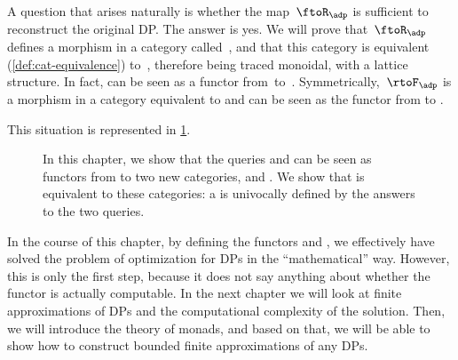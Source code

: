 A question that arises naturally is whether the map~$\ftoR_\adp$ is sufficient to reconstruct the original DP.
The answer is yes.
We will prove that~$\ftoR_\adp$ defines a morphism in a category called~\UPos, and that this category is equivalent (\cref{def:cat-equivalence}) to~\DP, therefore being traced monoidal, with a lattice structure.
In fact, \FixFunMinRes can be seen as a functor from~\DP to~\UPos.
Symmetrically,~$\rtoF_\adp$ is a morphism in a category \LPos equivalent to \DP and \FixResMaxFun can be seen as the functor from \DP to \LPos.

This situation is represented in \cref{fig:upos_lpos_dp}.

\begin{figure}[tbh]
    \centering
    \caption{In this chapter, we show that the queries \FixResMaxFun and \FixFunMinRes
        can be seen as functors from \DP to two new categories, \UPos and \LPos.
        We show that \DP is equivalent to these categories: a \DP is univocally
        defined by the answers to the two queries.
    }
    \label{fig:upos_lpos_dp}
\end{figure}

In the course of this chapter, by defining the functors \FixFunMinRes
and \FixResMaxFun, we effectively have solved the problem of optimization for DPs in the ``mathematical'' way.
However, this is only the first step, because it does not say anything about whether the functor is actually computable.
In the next chapter  we will look at finite approximations of DPs and the computational complexity of the solution.
Then, we will introduce the theory of monads, and based on that, we will be able to show how to construct bounded finite approximations of any DPs.
